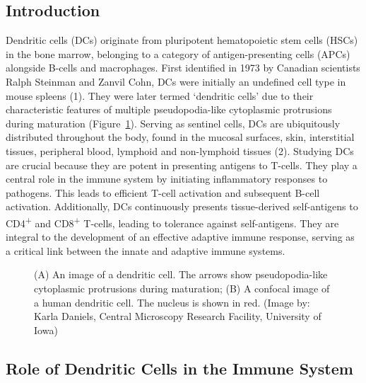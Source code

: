 \documentclass[
]{article}
\begin{document}
\subsection{Introduction}\label{introduction}

Dendritic cells (DCs) originate from pluripotent hematopoietic stem
cells (HSCs) in the bone marrow, belonging to a category of
antigen-presenting cells (APCs) alongside B-cells and macrophages. First
identified in 1973 by Canadian scientists Ralph Steinman and Zanvil
Cohn, DCs were initially an undefined cell type in mouse spleens (1).
They were later termed `dendritic cells' due to their characteristic
features of multiple pseudopodia-like cytoplasmic protrusions during
maturation (Figure~\ref{fig-dc}). Serving as sentinel cells, DCs are
ubiquitously distributed throughout the body, found in the mucosal
surfaces, skin, interstitial tissues, peripheral blood, lymphoid and
non-lymphoid tissues (2). Studying DCs are crucial because they are
potent in presenting antigens to T-cells. They play a central role in
the immune system by initiating inflammatory responses to pathogens.
This leads to efficient T-cell activation and subsequent B-cell
activation. Additionally, DCs continuously presents tissue-derived
self-antigens to CD4\textsuperscript{+} and CD8\textsuperscript{+}
T-cells, leading to tolerance against self-antigens. They are integral
to the development of an effective adaptive immune response, serving as
a critical link between the innate and adaptive immune systems.

\begin{figure}


\caption{\label{fig-dc}(A) An image of a dendritic cell. The arrows show
pseudopodia-like cytoplasmic protrusions during maturation; (B) A
confocal image of a human dendritic cell. The nucleus is shown in red.
(Image by: Karla Daniels, Central Microscopy Research Facility,
University of Iowa)}

\end{figure}%

\subsection{Role of Dendritic Cells in the Immune
System}\label{role-of-dendritic-cells-in-the-immune-system}
\end{document}
